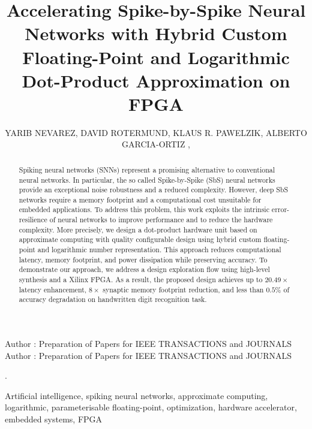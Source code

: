 \title {Accelerating Spike-by-Spike Neural Networks with Hybrid Custom Floating-Point and Logarithmic Dot-Product Approximation on FPGA}

\author{
	\uppercase{Yarib Nevarez},	
	\uppercase{David Rotermund},
	\uppercase{Klaus R. Pawelzik},
	\uppercase{Alberto Garcia-Ortiz} ,
}

\address[1]{Institute of Electrodynamics and Microelectronics, University of Bremen, Bremen 28359, Germany (e-mail: nevarez@item.uni-bremen.de)}

\address[2]{Institute for Theoretical Physics, University of Bremen, Bremen 28359, Germany (e-mail: davrot@@neuro.uni-bremen.de)}

\address[3]{Institute for Theoretical Physics, University of Bremen, Bremen 28359, Germany (e-mail: pawelzik@@neuro.uni-bremen.de)}

\address[4]{Institute of Electrodynamics and Microelectronics, University of Bremen, Bremen 28359, Germany (e-mail: agaracia@item.uni-bremen.de)}


\markboth
{Author \headeretal: Preparation of Papers for IEEE TRANSACTIONS and JOURNALS}
{Author \headeretal: Preparation of Papers for IEEE TRANSACTIONS and JOURNALS}

.

\begin{abstract}
  Spiking neural networks (SNNs) represent a promising alternative to
  conventional neural networks. In particular, the so called
  Spike-by-Spike (SbS) neural networks provide an exceptional noise
  robustness and a reduced complexity. However, deep SbS networks
  require a memory footprint and a computational cost unsuitable for
  embedded applications. To address this problem, this work exploits
  the intrinsic error-resilience of neural networks to improve
  performance and to reduce the hardware complexity. More precisely, we
  design a dot-product hardware unit based on approximate computing
  with quality configurable design using hybrid custom floating-point and logarithmic number representation. This approach reduces
  computational latency, memory footprint, and power dissipation while
  preserving accuracy. To demonstrate our approach, we address a
  design exploration flow using high-level synthesis and a Xilinx
  FPGA. As a result, the proposed design achieves up to $20.49\times$
  latency enhancement, $8\times$ synaptic memory footprint reduction,
  and less than $0.5\%$ of accuracy degradation on handwritten digit
  recognition task.
	
\end{abstract}

\begin{keywords}
Artificial intelligence, spiking neural networks, approximate computing, logarithmic, parameterisable floating-point, optimization, hardware accelerator, embedded systems, FPGA
\end{keywords}

\titlepgskip=-15pt

\maketitle
